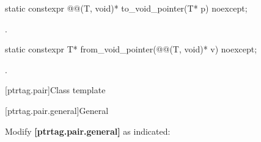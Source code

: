 \documentclass{wg21}
\newcommand{\editinstr}[1]{\textcolor{noteclr}{#1}}
\begin{document}
\begin{addedblock}
%
\begin{itemdecl}
static constexpr @@(T, void)* to_void_pointer(T* p) noexcept;
\end{itemdecl}

\begin{itemdescr}
\pnum
\returns
{}.
\end{itemdescr}

%
\begin{itemdecl}
static constexpr T* from_void_pointer(@@(T, void)* v) noexcept;
\end{itemdecl}

\begin{itemdescr}
\pnum
\returns
{}.
\end{itemdescr}


\end{addedblock}

[ptrtag.pair]{Class template }

[ptrtag.pair.general]{General}

\editinstr{Modify \textbf{[ptrtag.pair.general]} as indicated:}
\end{document}
